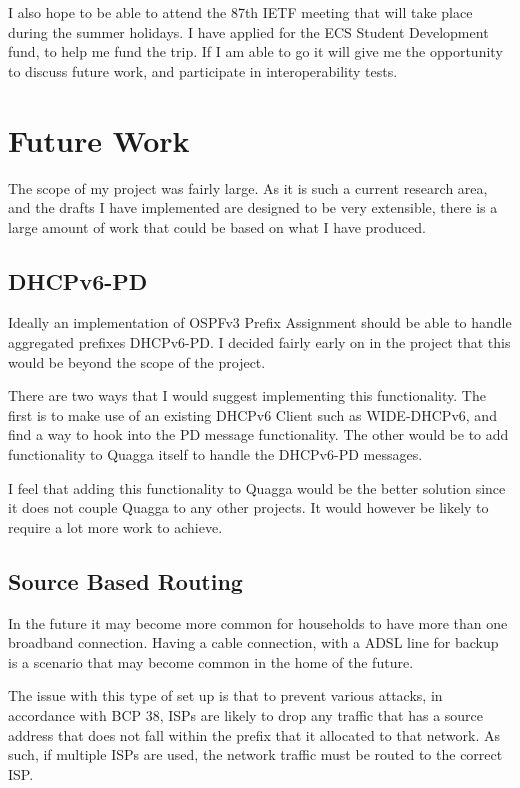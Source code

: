 \documentclass[12pt]{report}
\begin{document}
I also hope to be able to attend the 87th IETF meeting that will take place
during the summer holidays. I have applied for the ECS Student Development
fund, to help me fund the trip. If I am able to go it will give me the
opportunity to discuss future work, and participate in interoperability tests.

\section{Future Work}
The scope of my project was fairly large. As it is such a current research
area, and the drafts I have implemented are designed to be very extensible,
there is a large amount of work that could be based on what I have produced. 

\subsection{DHCPv6-PD}
Ideally an implementation of OSPFv3 Prefix Assignment should be able to handle
aggregated prefixes DHCPv6-PD\@. I decided fairly early on in the project that
this would be beyond the scope of the project. 

There are two ways that I would suggest implementing this functionality. The
first is to make use of an existing DHCPv6 Client such as WIDE-DHCPv6, and find
a way to hook into the PD message functionality. The other would be to add
functionality to Quagga itself to handle the DHCPv6-PD messages. 

I feel that adding this functionality to Quagga would be the better solution
since it does not couple Quagga to any other projects. It would however be
likely to require a lot more work to achieve.

\subsection{Source Based Routing}
In the future it may become more common for households to have more than one
broadband connection. Having a cable connection, with a ADSL line for backup is
a scenario that may become common in the home of the future. 

The issue with this type of set up is that to prevent various attacks, in
accordance with BCP 38, ISPs are likely to drop any traffic that has a source
address that does not fall within the prefix that it allocated to that network.
As such, if multiple ISPs are used, the network traffic must be routed to the
correct ISP. 
\end{document}
